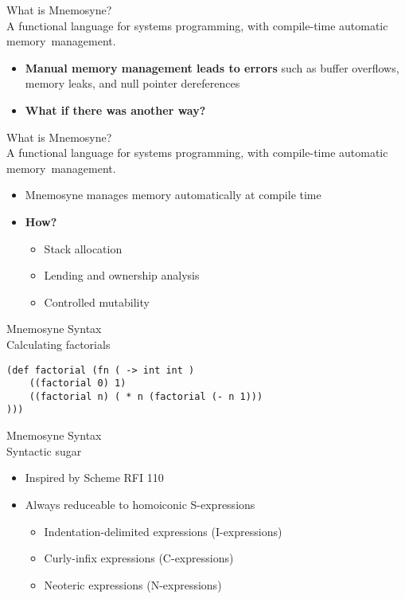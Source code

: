 \documentclass{beamer}
\begin{document}
\begin{frame}
\alert{\huge{What is Mnemosyne?}}\\
\large{A functional language for systems programming, \alert{with compile-time automatic memory~management}.}\normalsize
\begin{itemize}
    \item \textbf{Manual memory management leads to errors} such as buffer overflows, memory leaks, and null pointer dereferences~\cite{Shapiro:2006:PLC:1215995.1216004,hawblitzel2004low}
    \item \textbf{What if there was another way?}
\end{itemize}
\end{frame}

\begin{frame}
\alert{\huge{What is Mnemosyne?}}\\
\large{A functional language for systems programming, \alert{with compile-time automatic memory~management}.}\normalsize
\begin{itemize}
    \item Mnemosyne manages memory automatically at compile time
    \item \textbf{How?}
    \begin{itemize}
    \item<2-> Stack allocation~\cite{Hanson:1990:ESA:91556.91603,Corry:2006:OSA:1133956.1133978,Matsakis:2014:RL:2663171.2663188}
    \item<2-> Lending and ownership analysis~\cite{Matsakis:2014:RL:2663171.2663188}
    \item<2-> Controlled mutability~\cite{Matsakis:2014:RL:2663171.2663188}
\end{itemize}
\end{itemize}
\end{frame}

\begin{frame}[fragile]
\alert{\huge{Mnemosyne Syntax}}\\
\large{Calculating factorials}\normalsize
\begin{verbatim}
(def factorial (fn ( -> int int )
    ((factorial 0) 1)
    ((factorial n) ( * n (factorial (- n 1)))
)))
\end{verbatim}
\end{frame}

\begin{frame}
\alert{\huge{Mnemosyne Syntax}}\\
\large{Syntactic sugar}\normalsize
\begin{itemize}
    \item Inspired by Scheme RFI 110~\cite{wheeler2006sweet}
    \item Always reduceable to homoiconic S-expressions
    \begin{itemize}
        \item Indentation-delimited expressions (I-expressions)
        \item Curly-infix expressions (C-expressions)
        \item Neoteric expressions (N-expressions)
    \end{itemize}
\end{itemize}
\end{frame}
\end{document}
